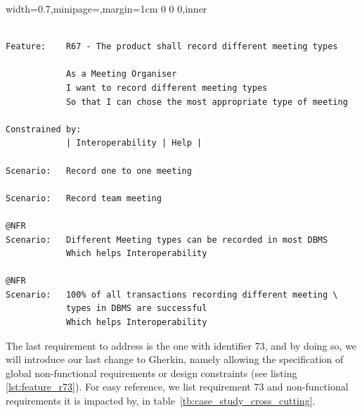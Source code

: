 \documentclass[dissertation,final]{softeng}
\newcommand{\nfrs}{non-functional requirements\xspace}
\newenvironment{featurecode}[1]
{ \lrbox\featurebox \begin{adjustbox}{width=#1\textwidth,minipage=\textwidth,margin=1cm 0 0 0,inner} }
{ \end{adjustbox}\endlrbox}
\newenvironment{featurelist}[2]
{
\newcommand{\setcaption}{\caption{#1}}
\newcommand{\setlabel}{\label{#2}}
}
{\begin{listing}[h!]\centering\usebox\featurebox\setcaption\setlabel\end{listing}}
\begin{document}
\begin{featurelist}{Changes to Gherkin -- R67 -- The product shall record different meeting types}{lst:feature_r67}
\begin{featurecode}{0.7}
\begin{verbatim}

Feature:    R67 - The product shall record different meeting types

            As a Meeting Organiser
            I want to record different meeting types
            So that I can chose the most appropriate type of meeting
	
Constrained by:
            | Interoperability | Help |

Scenario:   Record one to one meeting

Scenario:   Record team meeting
	
@NFR	
Scenario:   Different Meeting types can be recorded in most DBMS
            Which helps Interoperability

@NFR
Scenario:   100% of all transactions recording different meeting \
            types in DBMS are successful
            Which helps Interoperability
\end{verbatim}
\end{featurecode}
\end{featurelist}

The last requirement to address is the one with identifier 73, and by doing so, we will introduce our last change to Gherkin, namely allowing the specification of global \nfrs or design constraints (see listing \ref{lst:feature_r73}). For easy reference, we list requirement 73 and \nfrs it is impacted by, in table~\ref{tb:case_study_cross_cutting}.

\begin{table}[h!]
\caption[Cross-cutting \nfrs]{Cross-cutting \nfrs}
\label{tb:case_study_cross_cutting}
\setlength{\extrarowheight}{1.8pt}
\centering
{}
\end{table}
\end{document}
